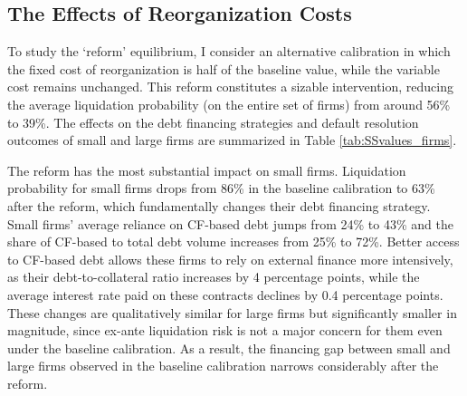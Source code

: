 \documentclass[12pt]{article}
\begin{document}
\subsection{The Effects of Reorganization Costs}
To study the `reform' equilibrium, I consider an alternative calibration in which the fixed cost of reorganization is half of the baseline value, while the variable cost remains unchanged. This reform constitutes a sizable intervention, reducing the average liquidation probability (on the entire set of firms) from around 56\% to 39\%. The effects on the debt financing strategies and default resolution outcomes of small and large firms are summarized in Table \ref{tab:SSvalues_firms}.

The reform has the most substantial impact on small firms. Liquidation probability for small firms drops from 86\%  in the baseline calibration to 63\% after the reform, which fundamentally changes their debt financing strategy. Small firms' average reliance on CF-based debt jumps from 24\% to 43\% and the share of CF-based to total debt volume increases from 25\% to 72\%. Better access to CF-based debt allows these firms to rely on external finance more intensively, as their debt-to-collateral ratio increases by 4 percentage points, while the average interest rate paid on these contracts declines by 0.4 percentage points. These changes are qualitatively similar for large firms but significantly smaller in magnitude, since ex-ante liquidation risk is not a major concern for them even under the baseline calibration. As a result, the financing gap between small and large firms observed in the baseline calibration narrows considerably after the reform.
\end{document}
